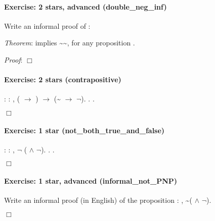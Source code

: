 \documentclass[12pt]{report}
\begin{document}
\paragraph{Exercise: 2 stars, advanced (double\_neg\_inf)}

 Write an informal proof of :


   \textit{Theorem}:  implies \~{}\~{}, for any proposition .


   \textit{Proof}:
   \ensuremath{\Box}


\paragraph{Exercise: 2 stars (contrapositive)}

\begin{coqdoccode}
\coqdocnoindent
{}  : \coqdockw{\ensuremath{\forall}}   : ,\coqdoceol
\coqdocindent{1.00em}
( \ensuremath{\rightarrow} ) \ensuremath{\rightarrow} (\~{} \ensuremath{\rightarrow} \ensuremath{\lnot}).\coqdoceol
\coqdocnoindent
{}.\coqdoceol
 .\coqdoceol
\end{coqdoccode}
\ensuremath{\Box} 

\paragraph{Exercise: 1 star (not\_both\_true\_and\_false)}

\begin{coqdoccode}
\coqdocnoindent
{}  : \coqdockw{\ensuremath{\forall}}  : ,\coqdoceol
\coqdocindent{1.00em}
\ensuremath{\lnot} ( \ensuremath{\land} \ensuremath{\lnot}).\coqdoceol
\coqdocnoindent
{}.\coqdoceol
 .\coqdoceol
\end{coqdoccode}
\ensuremath{\Box} 

\paragraph{Exercise: 1 star, advanced (informal\_not\_PNP)}

 Write an informal proof (in English) of the proposition \coqdockw{\ensuremath{\forall}} 
    : , \~{}( \ensuremath{\land} \ensuremath{\lnot}). \begin{coqdoccode}
\coqdocemptyline
\end{coqdoccode}
\ensuremath{\Box} 
\end{document}
